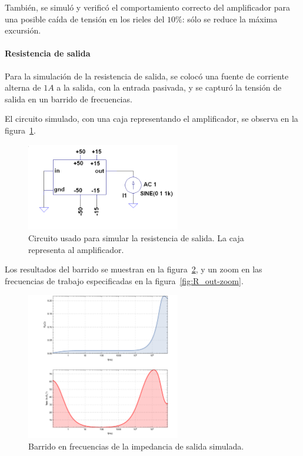 \documentclass[a4paper,12pt,twoside]{article}
\begin{document}
También, se simuló y verificó el comportamiento correcto del amplificador para una posible caída de tensión en los rieles del $10\%$: sólo se reduce la máxima excursión.

\paragraph{Resistencia de salida}  

Para la simulación de la resistencia de salida, se colocó una fuente de corriente alterna de $1A$ a la salida, con la entrada pasivada, y se capturó la tensión de salida en un barrido de frecuencias.


El circuito simulado, con una caja representando el amplificador, se observa en la figura~\ref{fig:circuito_r-out-current}.


\begin{figure}[H]
	\centering
	\includegraphics[width=0.6\textwidth]{img/sim/circuito-r_out-current}
	\caption{Circuito usado para simular la resistencia de salida. La caja representa al amplificador.}
	\label{fig:circuito_r-out-current}
\end{figure}

Los resultados del barrido se muestran en la figura~\ref{fig:R_out}, y un zoom en las frecuencias de trabajo especificadas en la figura~\ref{fig:R_out-zoom}.

\begin{figure}[H]
	\centering
	\includegraphics[width=0.6\textwidth]{img/sim/R_out}
	\caption{Barrido en frecuencias de la impedancia de salida simulada.}
	\label{fig:R_out}
\end{figure}
\end{document}

